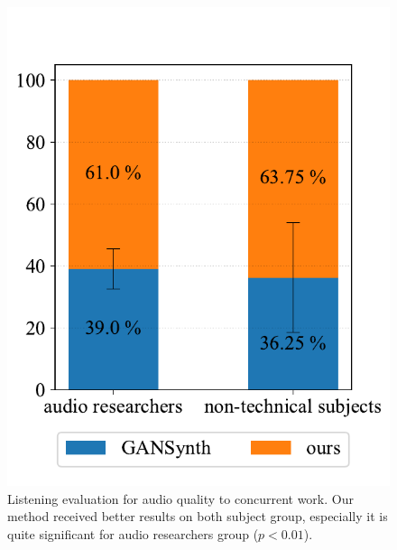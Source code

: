 \begin{figure}[t]
    \centering
    \includegraphics[width=0.76\linewidth]{assets/figures/quality_result.pdf}
    \caption{Listening evaluation for audio quality to concurrent work. Our method received better results on both subject group, especially it is quite significant for audio researchers group ($p < 0.01$).}
    \label{fig:quality_result}
    \vspace{-1em}
\end{figure}